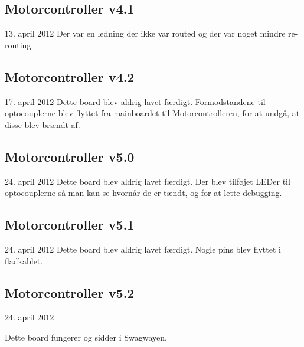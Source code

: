 \documentclass[a4paper,twoside,article,danish,table]{memoir}
\newcommand{\boarddate}[1]{\textcolor{blue!80!black}{#1}}
\begin{document}
\subsection{Motorcontroller v4.1}
\boarddate{13. april 2012}
Der var en ledning der ikke var routed og der var noget mindre re-routing.

\subsection{Motorcontroller v4.2}
\boarddate{17. april 2012} Dette board blev aldrig lavet færdigt.
Formodstandene til optocouplerne blev flyttet fra mainboardet til Motorcontrolleren, for at undgå, at disse blev brændt af.

\subsection{Motorcontroller v5.0}
\boarddate{24. april 2012} Dette board blev aldrig lavet færdigt.
Der blev tilføjet LEDer til optocouplerne så man kan se hvornår de er tændt, og for at lette debugging.  

\subsection{Motorcontroller v5.1}
\boarddate{24. april 2012} Dette board blev aldrig lavet færdigt.
Nogle pins blev flyttet i fladkablet. 

\subsection{Motorcontroller v5.2}
\boarddate{24. april 2012}

Dette board fungerer og sidder i Swagwayen.
\end{document}
